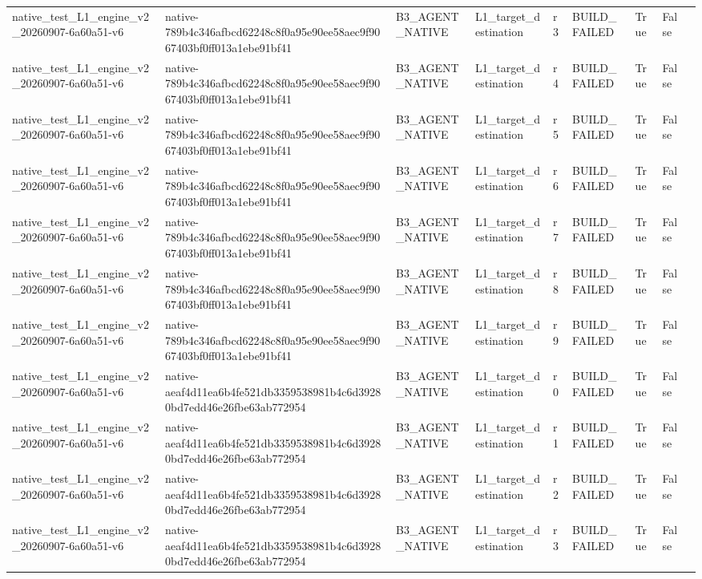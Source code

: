 \begin{tabular}{lllllllll}
native\_test\_L1\_engine\_v2\_20260907-6a60a51-v6 & native-789b4c346afbcd62248c8f0a95e90ee58aec9f9067403bf0ff013a1ebe91bf41 & B3\_AGENT\_NATIVE & L1\_target\_destination & r3 & BUILD\_FAILED & True & False &  \\
native\_test\_L1\_engine\_v2\_20260907-6a60a51-v6 & native-789b4c346afbcd62248c8f0a95e90ee58aec9f9067403bf0ff013a1ebe91bf41 & B3\_AGENT\_NATIVE & L1\_target\_destination & r4 & BUILD\_FAILED & True & False &  \\
native\_test\_L1\_engine\_v2\_20260907-6a60a51-v6 & native-789b4c346afbcd62248c8f0a95e90ee58aec9f9067403bf0ff013a1ebe91bf41 & B3\_AGENT\_NATIVE & L1\_target\_destination & r5 & BUILD\_FAILED & True & False &  \\
native\_test\_L1\_engine\_v2\_20260907-6a60a51-v6 & native-789b4c346afbcd62248c8f0a95e90ee58aec9f9067403bf0ff013a1ebe91bf41 & B3\_AGENT\_NATIVE & L1\_target\_destination & r6 & BUILD\_FAILED & True & False &  \\
native\_test\_L1\_engine\_v2\_20260907-6a60a51-v6 & native-789b4c346afbcd62248c8f0a95e90ee58aec9f9067403bf0ff013a1ebe91bf41 & B3\_AGENT\_NATIVE & L1\_target\_destination & r7 & BUILD\_FAILED & True & False &  \\
native\_test\_L1\_engine\_v2\_20260907-6a60a51-v6 & native-789b4c346afbcd62248c8f0a95e90ee58aec9f9067403bf0ff013a1ebe91bf41 & B3\_AGENT\_NATIVE & L1\_target\_destination & r8 & BUILD\_FAILED & True & False &  \\
native\_test\_L1\_engine\_v2\_20260907-6a60a51-v6 & native-789b4c346afbcd62248c8f0a95e90ee58aec9f9067403bf0ff013a1ebe91bf41 & B3\_AGENT\_NATIVE & L1\_target\_destination & r9 & BUILD\_FAILED & True & False &  \\
native\_test\_L1\_engine\_v2\_20260907-6a60a51-v6 & native-aeaf4d11ea6b4fe521db3359538981b4c6d39280bd7edd46e26fbe63ab772954 & B3\_AGENT\_NATIVE & L1\_target\_destination & r0 & BUILD\_FAILED & True & False &  \\
native\_test\_L1\_engine\_v2\_20260907-6a60a51-v6 & native-aeaf4d11ea6b4fe521db3359538981b4c6d39280bd7edd46e26fbe63ab772954 & B3\_AGENT\_NATIVE & L1\_target\_destination & r1 & BUILD\_FAILED & True & False &  \\
native\_test\_L1\_engine\_v2\_20260907-6a60a51-v6 & native-aeaf4d11ea6b4fe521db3359538981b4c6d39280bd7edd46e26fbe63ab772954 & B3\_AGENT\_NATIVE & L1\_target\_destination & r2 & BUILD\_FAILED & True & False &  \\
native\_test\_L1\_engine\_v2\_20260907-6a60a51-v6 & native-aeaf4d11ea6b4fe521db3359538981b4c6d39280bd7edd46e26fbe63ab772954 & B3\_AGENT\_NATIVE & L1\_target\_destination & r3 & BUILD\_FAILED & True & False &  \\

\end{tabular}
